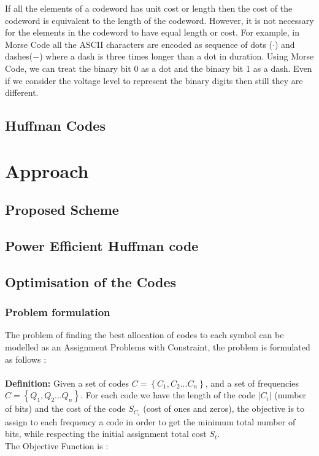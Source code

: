 \documentclass[preprint,12pt]{elsarticle}
\begin{document}
If all the elements of a codeword has unit cost or length then the cost of the codeword is equivalent to the length of the codeword. However, it is not necessary for the elements in the codeword to have equal length or cost. For example, in Morse Code all the ASCII characters are encoded as sequence of dots ($\cdot$) and dashes($-$) where a dash is three times longer than a dot in duration\cite{Redmond09}. Using Morse Code, we can treat the binary bit 0 as a dot and the binary bit 1 as a dash. Even if we consider the voltage level to represent the binary digits then still they are different.
\subsection{Huffman Codes}

\section{Approach}
\subsection{Proposed Scheme}
\subsection{Power Efficient Huffman code}
\subsection{Optimisation of the Codes}
\subsubsection{Problem formulation}
The problem of finding the best allocation of codes to each symbol can be   modelled as an Assignment Problems with Constraint, the problem is formulated as follows :\\\\
\textbf{Definition:} Given a set of codes $C=\left\{C_{1},C_{2}...C_{n}\right\}$, and a set of frequencies $C=\left\{Q_{1},Q_{2}...Q_{n}\right\}$. For each code we have the length of the code $|C_{i}|$ (number of bits) and the cost of the code $S_{C_{i}}$ (cost of ones and zeros), the objective is to assign to each frequency a code in order to get the minimum total number of bits, while respecting the initial assignment total cost $S_{t}$.   
\\
The Objective Function is : 
\end{document}
